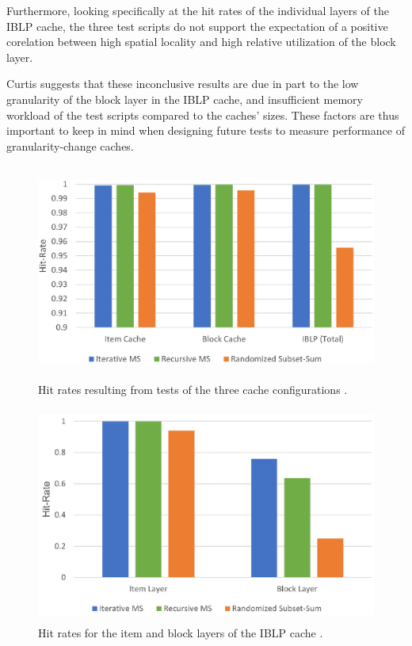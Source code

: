 \documentclass[12pt,twoside]{reedthesis}
\begin{document}
	Furthermore, looking specifically at the hit rates of the individual layers of the IBLP cache, the three test scripts do not support the expectation of a positive corelation between high spatial locality and high relative utilization of the block layer.

	Curtis suggests that these inconclusive results are due in part to the low granularity of the block layer in the IBLP cache, and insufficient memory workload of the test scripts compared to the caches' sizes. These factors are thus important to keep in mind when designing future tests to measure performance of granularity-change caches.

	\newpage
	\null
	\vfill

	\begin{figure}[h]
		\centering
		\includegraphics[height=2.8in]{figures/curtis_cache_hit_rates.png}
		\caption{Hit rates resulting from tests of the three cache configurations \cite{curtis}.}
	\end{figure}

	\vfill

	\begin{figure}[h]
		\centering
		\includegraphics[height=2.8in]{figures/curtis_layer_hit_rates.png}
		\caption{Hit rates for the item and block layers of the IBLP cache \cite{curtis}.}
	\end{figure}
\end{document}
